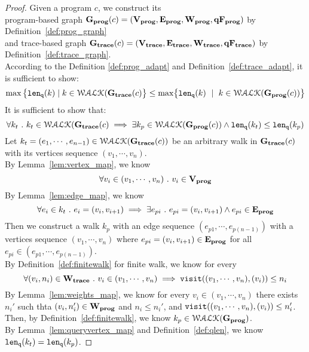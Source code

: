 \begin{proof}
Given a program ${c}$, 
we construct its 
\\
program-based graph $\mathtt{\bf{G_{prog}}}({c}) = (\mathtt{\bf{V_{prog}}}, \mathtt{\bf{E_{prog}}}, \mathtt{\bf{W_{prog}}}, \mathtt{\bf{qF_{prog}}})$
by Definition~\ref{def:prog_graph}
\\ and 
trace-based graph $\mathtt{\bf{G_{trace}}}({c}) = (\mathtt{\bf{V_{trace}}}, \mathtt{\bf{E_{trace}}}, \mathtt{\bf{W_{trace}}}, \mathtt{\bf{qF_{trace}}})$  by Definition~\ref{def:trace_graph}.
\\
According to the Definition \ref{def:prog_adapt} and Definition~\ref{def:trace_adapt}, it is sufficient to show:
%
$$
\max \big 
\{ \qlen(k) \mid k \in \walks(\traceG(c) \big \} 
\leq
\max\left\{ \qlen(k) \ \mid \  k\in \walks(\progG({c}))\right \}
$$
%
%
It is sufficient to show that:
\[
  \forall k_t ~.~ 
  k_t \in \mathcal{WALK}(\mathtt{\bf{G_{trace}}}({c}) \implies
  \exists k_p \in \mathcal{WALK}(\mathtt{\bf{G_{prog}}}({c})) \land 
  \mathtt{len}_{\tt q}(k_t) \leq \mathtt{len}_{\tt q}(k_p)
\]
%
Let $k_t = (e_1, \cdots, e_{n-1}) \in \mathcal{WALK}(\mathtt{\bf{G_{trace}}}(c))$ be an arbitrary walk in $\mathtt{\bf{G_{trace}}}(c)$ with its vertices sequence 
$(v_1, \cdots, v_n)$.
\\
By Lemma~\ref{lem:vertex_map},
we know 
\[
  \forall v_i \in (v_1, \cdots, v_n) ~.~ v_i \in \mathtt{\bf{V_{prog}}}
  \]
%
By Lemma~\ref{lem:edge_map}, we know
%
\[
  \forall e_i \in k_t ~.~ e_i = (v_i, v_{i + 1}) \implies
  \exists e_{pi} ~.~ e_{pi} = (v_i, v_{i + 1}) \land e_{pi} \in \mathtt{\bf{E_{prog}}}
  \]
Then we construct a walk $k_p$ with an edge sequence $(e_{p1}, \cdots, e_{p(n-1)}) $ 
with a vertices sequence $(v_1, \cdots, v_n)$ where 
$e_{pi} = (v_i, v_{i + 1}) \in \mathtt{\bf{E_{prog}}}$ for all $e_{pi} \in (e_{p1}, \cdots, e_{p(n-1)})$.
\\
By Definition~\ref{def:finitewalk} for finite walk, 
we know for every
\[
  \forall (v_i, n_i) \in \mathtt{\bf{W_{trace}}} ~.~ v_i \in (v_1, \cdots, v_n)
  \implies \mathtt{visit}((v_1, \cdots, v_n), (v_i)) \leq n_i
\] 
%
By Lemma~\ref{lem:weights_map},  we know for every $ v_i \in (v_1, \cdots, v_n)$
 there exists $n_i'$ such thta $(v_i, n_i') \in \mathtt{\bf{W_{prog}}}$ and $n_i \leq n_i'$,
and $\mathtt{visit}((v_1, \cdots, v_n), (v_i)) \leq n_i'$.
\\
Then, by Definition~\ref{def:finitewalk}, we know $k_p \in \mathcal{WALK}(\mathtt{\bf{G_{prog}}})$.
\\
By Lemma~\ref{lem:queryvertex_map} and Definition~\ref{def:qlen}, we know $\mathtt{len}_{\tt q}(k_t) = \mathtt{len}_{\tt q}(k_p)$.

\end{proof}
